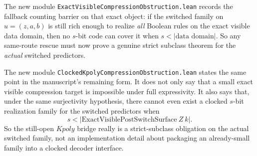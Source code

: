 \documentclass[11pt]{article}
\theoremstyle{remark}
\begin{document}
The new module \texttt{ExactVisibleCompressionObstruction.lean} records the
fallback counting barrier on that exact object: if the switched family on
\(u=(z,a,b)\) is still rich enough to realize \emph{all} Boolean rules on the
exact visible data domain, then no \(s\)-bit code can cover it when
\(s < |\text{data domain}|\).  So any same-route rescue must now prove a genuine
strict subclass theorem for the \emph{actual} switched predictors.

The new module \texttt{ClockedKpolyCompressionObstruction.lean} states the same
point in the manuscript's remaining form.  It does not only say that a small
exact visible compression target is impossible under full expressivity.  It
also says that, under the same surjectivity hypothesis, there cannot even
exist a clocked \(s\)-bit realization family for the switched predictors when
\[
  s < |\text{ExactVisiblePostSwitchSurface}\ Z\ k|.
\]
So the still-open \(Kpoly\) bridge really is a strict-subclass obligation on
the actual switched family, not an implementation detail about packaging an
already-small family into a clocked decoder interface.
\end{document}
